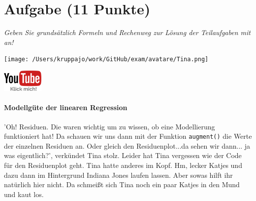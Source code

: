 \documentclass[a4paper, 9pt]{scrartcl}\usepackage[]{graphicx}\usepackage[]{xcolor}
\begin{document}
\section{Aufgabe \hfill (11 Punkte)}

\textit{Geben Sie grundsätzlich Formeln und Rechenweg zur Lösung der Teilaufgaben mit an!} \\[1Ex]
 

 
\begin{minipage}[t]{0.5\textwidth}
\texttt{[image: /Users/kruppajo/work/GitHub/exam/avatare/Tina.png]}
\end{minipage}
\begin{minipage}[t]{0.5\textwidth}
\hfill
\href{https://youtu.be/dyQlYV9nOqY}{\includegraphics[width = 2cm]{img/youtube}}
\end{minipage}
\vspace{-3ex}



\paragraph{Modellgüte der linearen Regression}

'Oh! Residuen. Die waren wichtig um zu wissen, ob eine Modellierung funktioniert hat! Da schauen wir uns dann mit der Funktion \texttt{augment()} die Werte der einzelnen Residuen an. Oder gleich den Residuenplot...da sehen wir dann... ja was eigentlich?', verkündet Tina stolz. Leider hat Tina vergessen wie der \Rlogo Code für den Residuenplot geht. Tina hatte anderes im Kopf. Hm, lecker Katjes und dazu dann im Hintergrund Indiana Jones laufen lassen. Aber sowas hilft ihr natürlich hier nicht. Da schmeißt sich Tina noch ein paar Katjes in den Mund und kaut los.
\end{document}
